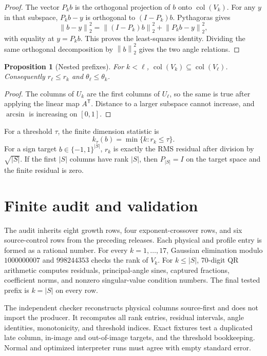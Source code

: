 \documentclass[10pt]{article}
\newtheorem{proposition}{Proposition}
\newcommand{\norm}[1]{\left\lVert #1\right\rVert}
\begin{document}
\begin{proof}
The vector $P_kb$ is the orthogonal projection of $b$ onto
$\operatorname{col}(V_k)$.  For any $y$ in that subspace,
$P_kb-y$ is orthogonal to $(I-P_k)b$.  Pythagoras gives
\[
 \norm{b-y}_2^2=\norm{(I-P_k)b}_2^2+\norm{P_kb-y}_2^2,
\]
with equality at $y=P_kb$.  This proves the least-squares identity.  Dividing
the same orthogonal decomposition by $\norm b_2^2$ gives the two angle
relations.
\end{proof}

\begin{proposition}[Nested prefixes]
For $k<\ell$, $\operatorname{col}(V_k)\subseteq
\operatorname{col}(V_\ell)$.  Consequently $r_\ell\leq r_k$ and
$\theta_\ell\leq\theta_k$.
\end{proposition}

\begin{proof}
The columns of $U_k$ are the first columns of $U_\ell$, so the same is true
after applying the linear map $A^{\mathsf T}$.  Distance to a larger
subspace cannot increase, and $\arcsin$ is increasing on $[0,1]$.
\end{proof}

For a threshold $\tau$, the finite dimension statistic is
\[
 k_\tau(b)=\min\{k:r_k\leq\tau\}.
\]
For a sign target $b\in\{-1,1\}^{|S|}$, $r_k$ is exactly the RMS residual
after division by $\sqrt{|S|}$.  If the first $|S|$ columns have rank
$|S|$, then $P_{|S|}=I$ on the target space and the finite residual is zero.

\section{Finite audit and validation}

The audit inherits eight growth rows, four exponent-crossover rows, and six
source-control rows from the preceding releases.  Each physical and profile
entry is formed as a rational number.  For every $k=1,\ldots,17$, Gaussian
elimination modulo $1000000007$ and $998244353$ checks the rank of $V_k$.
For $k\leq |S|$, 70-digit QR arithmetic computes residuals, principal-angle
sines, captured fractions, coefficient norms, and nonzero singular-value
condition numbers.  The final tested prefix is $k=|S|$ on every row.

The independent checker reconstructs physical columns source-first and does
not import the producer.  It recomputes all rank entries, residual intervals,
angle identities, monotonicity, and threshold indices.  Exact fixtures test a
duplicated late column, in-image and out-of-image targets, and the threshold
bookkeeping.  Normal and optimized interpreter runs must agree with empty
standard error.
\end{document}
